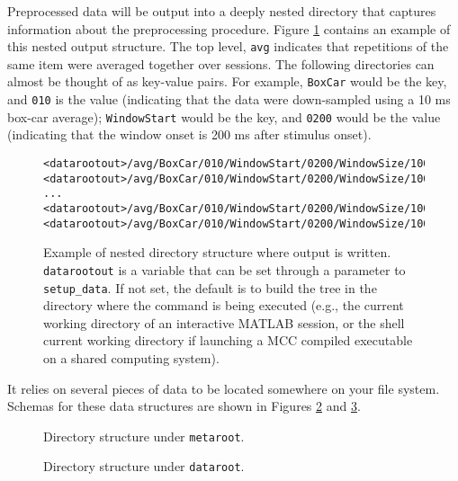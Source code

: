 \documentclass[12pt,a4paper]{article}
\newcommand{\matlab}[0]{MATLAB\textsuperscript{\textregistered}}
\begin{document}
Preprocessed data will be output into a deeply nested directory that captures information about the preprocessing procedure. Figure \ref{fig.nested_directory_output} contains an example of this nested output structure. The top level, \texttt{avg} indicates that repetitions of the same item were averaged together over sessions. The following directories can almost be thought of as key-value pairs. For example, \texttt{BoxCar} would be the key, and \texttt{010} is the value (indicating that the data were down-sampled using a 10 ms box-car average); \texttt{WindowStart} would be the key, and \texttt{0200} would be the value (indicating that the window onset is 200 ms after stimulus onset).

\begin{figure}
\begin{verbatim}
<datarootout>/avg/BoxCar/010/WindowStart/0200/WindowSize/1000/s01_raw.mat
<datarootout>/avg/BoxCar/010/WindowStart/0200/WindowSize/1000/s02_raw.mat
...
<datarootout>/avg/BoxCar/010/WindowStart/0200/WindowSize/1000/sNN_raw.mat
<datarootout>/avg/BoxCar/010/WindowStart/0200/WindowSize/1000/metadata_raw.mat
\end{verbatim}
\caption{Example of nested directory structure where output is written. \texttt{datarootout} is a variable that can be set through a parameter to \texttt{setup\_data}. If not set, the default is to build the tree in the directory where the command is being executed (e.g., the current working directory of an interactive \matlab{} session, or the shell current working directory if launching a MCC compiled executable on a shared computing system).}
\label{fig.nested_directory_output}
\end{figure}

It relies on several pieces of data to be located somewhere on your file system. Schemas for these data structures are shown in Figures \ref{fig.metaroot} and \ref{fig.dataroot}.

\begin{figure}

\caption{Directory structure under \texttt{metaroot}.}
\label{fig.metaroot}
\end{figure}

\begin{figure}

\caption{Directory structure under \texttt{dataroot}.}
\label{fig.dataroot}
\end{figure}
\end{document}
